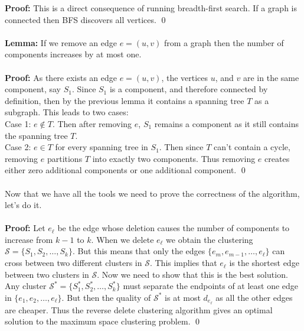 \documentclass{article}
\newcommand{\lem}{\textbf{Lemma: }}
\newcommand{\proo}{\textbf{Proof: }}
\newcommand{\mcal}[1]{\mathcal{#1}}
\begin{document}
\proo This is a direct consequence of running breadth-first search. If a graph is connected then BFS discovers all vertices.
\qed\\\\
\lem If we remove an edge $e = (u, v)$ from a graph then the number of components increases by at most one.\\\\
\proo As there exists an edge $e = (u, v)$, the vertices $u$, and $v$ are in the same component, say $S_1$. Since $S_1$ is a component, and therefore connected by definition, then by the previous lemma it contains a spanning tree $T$ as a subgraph. This leads to two cases:\\
Case 1: $e \notin T$. Then after removing $e$, $S_1$ remains a component as it still contains the spanning tree $T$.\\
Case 2: $e \in T$ for every spanning tree in $S_1$. Then since $T$ can't contain a cycle, removing $e$ partitions $T$ into exactly two components. Thus removing $e$ creates either zero additional components or one additional component.
\qed\\\\
Now that we have all the tools we need to prove the correctness of the algorithm, let's do it.\\\\
\proo Let $e_{\ell}$ be the edge whose deletion causes the number of components to increase from $k-1$ to $k$. When we delete $e_{\ell}$ we obtain the clustering $\mcal{S} = \{S_1, S_2, \dots, S_k\}$. But this means that only the edges $\{e_m, e_{m-1}, \dots, e_{\ell}\}$ can cross between two different clusters in $\mcal{S}$. This implies that $e_{\ell}$ is the shortest edge between two clusters in $\mcal{S}$. Now we need to show that this is the best solution. Any cluster $\mcal{S}^* = \{S_1^*, S_2^*, \dots, S_k^*\}$ must separate the endpoints of at least one edge in $\{e_1, e_2, \dots, e_{\ell}\}$. But then the quality of $\mcal{S}^*$ is at most $d_{e_{\ell}}$ as all the other edges are cheaper. Thus the reverse delete clustering algorithm gives an optimal solution to the maximum space clustering problem.
\qed
\end{document}
